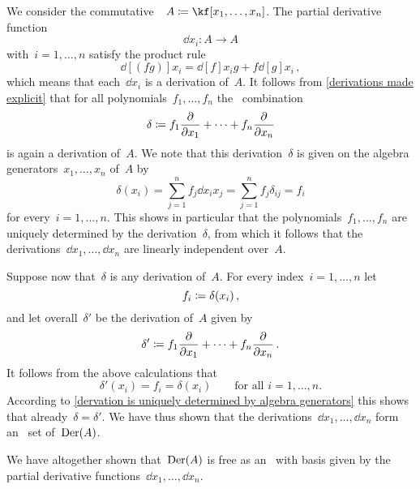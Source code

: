 \begin{example}
  \label{derivations of commutative polynomial algebra}
  We consider the commutative~\algebra{$\kf$}~$A \defined \kf[x_1, \dotsc, x_n]$.
  The partial derivative function
  \[
    \dd{x_i}
    \colon
    A
    \to
    A
  \]
  with~$i = 1, \dotsc, n$ satisfy the product rule
  \[
    \dd[(fg)]{x_i}
    =
    \dd[f]{x_i} g + f \dd[g]{x_i} \,,
  \]
  which means that each~$\dd{x_i}$ is a derivation of~$A$.
  It follows from \cref{derivations made explicit} that for all polynomials~$f_1, \dotsc, f_n$ the~ combination
  \[
    \delta
    \defined
    f_1 \dd{x_1} + \dotsb + f_n \dd{x_n}
  \]
  is again a derivation of~$A$.
  We note that this derivation~$\delta$ is given on the algebra generators~$x_1, \dotsc, x_n$ of~$A$ by
  \[
    \delta(x_i)
    =
    \sum_{j=1}^n f_j \dd{x_i}{x_j}
    =
    \sum_{j=1}^n f_j \delta_{ij}
    =
    f_i
  \]
  for every~$i = 1, \dotsc, n$.
  This shows in particular that the polynomials~$f_1, \dotsc, f_n$ are uniquely determined by the derivation~$\delta$, from which it follows that the derivations~$\dd{x_1}, \dotsc, \dd{x_n}$ are linearly independent over~$A$.

  Suppose now that~$\delta$ is any derivation of~$A$.
  For every index~$i = 1, \dotsc, n$ let
  \[
    f_i \coloneqq \delta(x_i) \,,
  \]
  and let overall~$\delta'$ be the derivation of~$A$ given by
  \[
    \delta'
    \defined
    f_1 \dd{x_1} + \dotsb + f_n \dd{x_n} \,.
  \]
  It follows from the above calculations that
  \[
    \delta'(x_i) = f_i = \delta(x_i)
    \qquad
    \text{for all~$i = 1, \dotsc, n$.}
  \]
  According to \cref{dervation is uniquely determined by algebra generators} this shows that already~$\delta = \delta'$.
  We have thus shown that the derivations~$\dd{x_1}, \dotsc, \dd{x_n}$ form an~ set of~$\operatorname{Der}(A)$.

  We have altogether shown that~$\operatorname{Der}(A)$ is free as an~ with basis given by the partial derivative functions~$\dd{x_1}, \dotsc, \dd{x_n}$.
\end{example}


